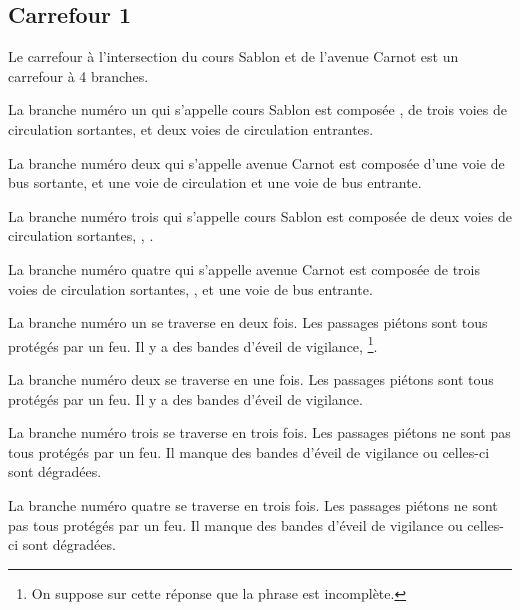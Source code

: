 \begin{appendix}
\label{annexe:q_ID39}

\subsection*{Carrefour 1}

\label{annexe:q_ID39_carrefour1}

Le carrefour à l'intersection du cours Sablon et de l'avenue Carnot est un carrefour à 4 branches.

\newpar{}

La branche numéro un qui s'appelle cours Sablon est composée , de trois voies de circulation sortantes, et deux voies de circulation entrantes.

\newpar{}

La branche numéro deux qui s'appelle avenue Carnot est composée d'une voie de bus sortante, et une voie de circulation et une voie de bus entrante.

\newpar{}

La branche numéro trois qui s'appelle cours Sablon est composée de deux voies de circulation sortantes, , .

\newpar{}

La branche numéro quatre qui s'appelle avenue Carnot est composée de trois voies de circulation sortantes, , et une voie de bus entrante.

\newpar{}

La branche numéro un se traverse en deux fois. Les passages piétons sont tous protégés par un feu. Il y a des bandes d'éveil de vigilance, \footnote{On suppose sur cette réponse que la phrase est incomplète.}.

\newpar{}

La branche numéro deux se traverse en une fois. Les passages piétons sont tous protégés par un feu. Il y a des bandes d'éveil de vigilance.

\newpar{}

La branche numéro trois se traverse en trois fois. Les passages piétons ne sont pas tous protégés par un feu. Il manque des bandes d'éveil de vigilance ou celles-ci sont dégradées.

\newpar{}

La branche numéro quatre se traverse en trois fois. Les passages piétons ne sont pas tous protégés par un feu. Il manque des bandes d'éveil de vigilance ou celles-ci sont dégradées.


\end{appendix}
